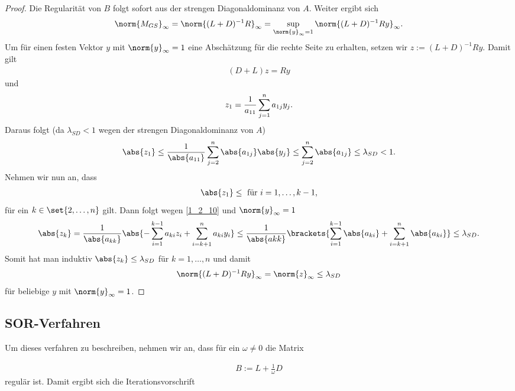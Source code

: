 \begin{proof}
	Die Regularität von $B$ folgt sofort aus der strengen Diagonaldominanz von $A$. Weiter ergibt sich
	\begin{align}
		\norm{M_{GS}}_{\infty} = \norm{(L+D)^{-1}R}_{\infty} = \sup_{\norm{y}_{\infty}=1} \norm{(L+D)^{-1}Ry}_{\infty}. \notag
	\end{align}
	Um für einen festen Vektor $y$ mit $\norm{y}_{\infty} = 1$ eine Abschätzung für die rechte Seite zu erhalten, setzen wir $z:= (L+D)^{-1}Ry$. Damit gilt
	\begin{align}
		(D+L)z = Ry \label{1_2_10}
	\end{align}
	und
	\begin{align}
	z_1 = \frac{1}{a_{11}} \sum_{j=1}^{n} a_{1j}y_j. \notag
	\end{align}
	Daraus folgt (da $\lambda_{SD} < 1$ wegen der strengen Diagonaldominanz von $A$)
	\begin{align}
		\abs{z_1} 
		\le \frac{1}{\abs{a_{11}}} \sum_{j=2}^{n} \abs{a_{1j}}\abs{y_j} 
		\le \sum_{j=2}^{n} \abs{a_{1j}} \le \lambda_{SD} < 1.\notag
	\end{align}
	Nehmen wir nun an, dass
	\begin{align}
		\abs{z_1} \le \text{ für } i = 1, \dots, k-1, \notag
	\end{align}
	für ein $k \in \set{2,\dots,n}$ gilt. Dann folgt wegen \cref{1_2_10} und $\norm{y}_{\infty} = 1$
	\begin{align}
		\abs{z_k} = \frac{1}{\abs{a_{kk}}} \abs{-\sum_{i=1}^{k-1} a_{ki}z_i + \sum_{i=k+1}^{n} a_{ki}y_i} 
		\le \frac{1}{\abs{a{kk}}} \brackets{\sum_{i=1}^{k-1} \abs{a_{ki}} + \sum_{i=k+1}^{n} \abs{a_{ki}}} \le \lambda_{SD}. \notag
	\end{align}
	Somit hat man induktiv $\abs{z_k} \le \lambda_{SD}$ für $k = 1, \dots, n$ und damit
	\begin{align}
		\norm{(L+D)^{-1}Ry}_{\infty} = \norm{z}_{\infty} \le \lambda_{SD} \notag
	\end{align}
	für beliebige $y$ mit $\norm{y}_{\infty} = 1$.
\end{proof}

\subsection{SOR-Verfahren}

Um dieses verfahren zu beschreiben, nehmen wir an, dass für ein $\omega \neq 0$ die Matrix

\begin{align}
	B:=L + \frac{1}{\omega}D \label{eq_2_2_11}
\end{align}
regulär ist. Damit ergibt sich die Iterationsvorschrift

